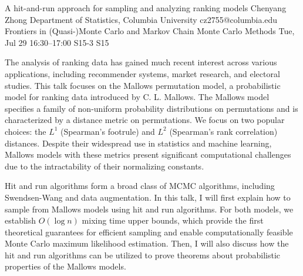 \begin{talk}
  {A hit-and-run approach for sampling and analyzing ranking models}%
  {Chenyang Zhong}%
  {Department of Statistics, Columbia University}%
  {cz2755@columbia.edu}%
  {Frontiers in (Quasi-)Monte Carlo and Markov Chain Monte Carlo Methods}%
  {}%
  {Tue, Jul 29 16:30--17:00}%
  {S15-3}%
  {S15}%
    
   
The analysis of ranking data has gained much recent interest across various applications, including recommender systems, market research, and electoral studies. This talk focuses on the Mallows permutation model, a probabilistic model for ranking data introduced by C. L. Mallows. The Mallows model specifies a family of non-uniform probability distributions on permutations and is characterized by a distance metric on permutations. We focus on two popular choices: the $L^1$ (Spearman’s footrule) and $L^2$ (Spearman’s rank correlation) distances. Despite their widespread use in statistics and machine learning, Mallows models with these metrics present significant computational challenges due to the intractability of their normalizing constants.

Hit and run algorithms form a broad class of MCMC algorithms, including Swendsen-Wang and data augmentation. In this talk, I will first explain how to sample from Mallows models using hit and run algorithms. For both models, we establish $O(\log n)$ mixing time upper bounds, which provide the first theoretical guarantees for efficient sampling and enable computationally feasible Monte Carlo maximum likelihood estimation. Then, I will also discuss how the hit and run algorithms can be utilized to prove theorems about probabilistic properties of the Mallows models.

\medskip


\end{talk}

